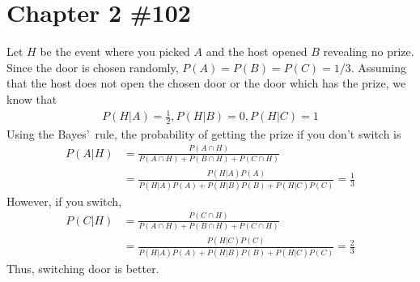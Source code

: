 \documentclass{scrartcl}
\begin{document}
\section{Chapter 2 \#102}
Let \(H\) be the event where you picked \(A\) and the host opened \(B\)
revealing no prize. Since the door is chosen randomly,
\(P(A) = P(B) = P(C) = 1/3\). Assuming that the host does not open the chosen
door or the door which has the prize, we know that
\begin{align*}
  P(H | A) = \frac{1}{2}, P(H | B) = 0, P(H | C) = 1
\end{align*}
Using the Bayes'~rule, the probability of getting the prize if you don't switch
is
\begin{align*}
  P(A | H)
  &= \frac{P(A \cap H)}{P(A \cap H) + P(B \cap H) + P(C \cap H)} \\
  &= \frac{P(H | A) P(A)}{P(H | A) P(A) + P(H | B) P(B) + P(H | C) P(C)}
  = \frac{1}{3}
\end{align*}
However, if you switch,
\begin{align*}
  P(C | H)
  &= \frac{P(C \cap H)}{P(A \cap H) + P(B \cap H) + P(C \cap H)} \\
  &= \frac{P(H | C) P(C)}{P(H | A) P(A) + P(H | B) P(B) + P(H | C) P(C)}
  = \frac{2}{3}
\end{align*}
Thus, switching door is better.
\end{document}
